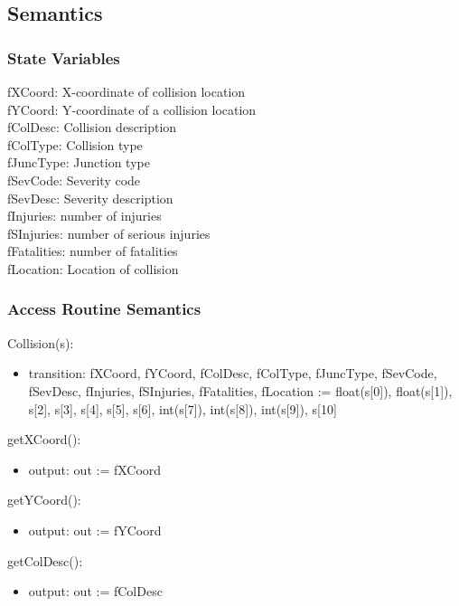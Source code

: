 \documentclass[12pt]{article}
\begin{document}
\subsection*{Semantics}
\subsubsection*{State Variables}
fXCoord: X-coordinate of collision location\\
fYCoord: Y-coordinate of a collision location\\
fColDesc: Collision description\\
fColType: Collision type\\
fJuncType: Junction type\\
fSevCode: Severity code\\
fSevDesc: Severity description\\
fInjuries: number of injuries\\
fSInjuries: number of serious injuries\\
fFatalities: number of fatalities\\
fLocation: Location of collision

\subsubsection*{Access Routine Semantics}

\noindent Collision(s):
\begin{itemize}
    \item transition: fXCoord, fYCoord, fColDesc, fColType, fJuncType, fSevCode, fSevDesc, fInjuries, fSInjuries, fFatalities, fLocation := float(s[0]), float(s[1]), s[2], s[3], s[4], s[5], s[6], int(s[7]), int(s[8]), int(s[9]), s[10]
\end{itemize}

\noindent getXCoord():
\begin{itemize}
    \item output: out := fXCoord
\end{itemize}

\noindent getYCoord():
\begin{itemize}
    \item output: out := fYCoord
\end{itemize}

\noindent getColDesc():
\begin{itemize}
    \item output: out := fColDesc
\end{itemize}
\end{document}

